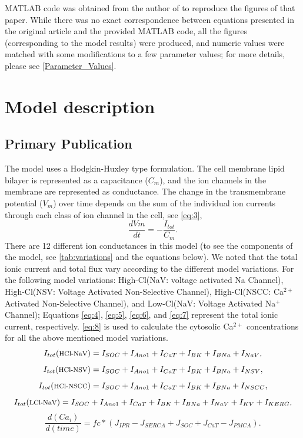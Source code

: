 \documentclass[fleqn,10pt]{physiome}
\begin{document}
MATLAB \citep{shampine1997matlab} code was obtained from the author of \citet{lees2014computational} to reproduce the figures of that paper. While there was no exact correspondence between equations presented in the original article and the provided MATLAB code, all the figures (corresponding to the model results) were produced, and numeric values were matched with some modifications to a few parameter values; for more details, please see \autoref{Parameter_Values}. 

\section{Model description}
\subsection{Primary Publication}

The model uses a Hodgkin-Huxley type formulation. The cell membrane lipid bilayer is represented as a capacitance ($C_{m}$), and the ion channels in the membrane are represented as conductance. The change in the transmembrane potential ($V_{m}$) over time depends on the sum of the individual ion currents through each class of ion channel in the cell, see \autoref{eq:3},
\begin{equation}
\frac{dVm}{dt} = - \frac{I_{tot}}{C_{m}} \label{eq:3}.    
\end{equation} 
There are 12 different ion conductances in this model (to see the components of the model, see \autoref{tab:variations} and the equations below). We noted that the total ionic current and total flux vary according to the different model variations.
For the following model variations: High-Cl(NaV: voltage activated Na Channel), High-Cl(NSV: Voltage Activated Non-Selective Channel), High-Cl(NSCC: Ca$^{2+}$ Activated Non-Selective Channel), and Low-Cl(NaV: Voltage Activated Na$^{+}$ Channel); Equations \ref{eq:4}, \ref{eq:5}, \ref{eq:6}, and \ref{eq:7} represent the total ionic current, respectively. \autoref{eq:8} is used to calculate the cytosolic Ca$^{2+}$ concentrations for all the above mentioned model variations.
\begin{equation}
  I_{tot}(\text{\footnotesize{HCl-NaV}}) = I_{SOC}+I_{Ano1}+I_{CaT}+I_{BK}+I_{BNa}+I_{NaV},  \label{eq:4}
\end{equation}
\begin{equation}
  I_{tot}(\text{\footnotesize{HCl-NSV}}) = I_{SOC}+I_{Ano1}+I_{CaT}+I_{BK}+I_{BNa}+I_{NSV},\label{eq:5}
\end{equation}
\begin{equation}
  I_{tot}(\text{\footnotesize{HCl-NSCC}}) = I_{SOC}+I_{Ano1}+I_{CaT}+I_{BK}+I_{BNa}+I_{NSCC}, \label{eq:6}
\end{equation}
\begin{equation}
  I_{tot}(\text{\footnotesize{LCl-NaV}}) = I_{SOC}+I_{Ano1}+I_{CaT}+I_{BK}+I_{BNa}+I_{NaV}+ I_{KV}+I_{KERG}, \label{eq:7}
\end{equation}
\begin{equation}
  \frac {d(Ca_{i})}{d(time)} = fc*(J_{IPR}-J_{SERCA}+J_{SOC}+J_{CaT}-J_{PMCA}). \label{eq:8} 
\end{equation}
\end{document}
